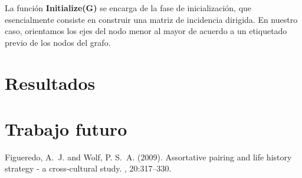 \documentclass[10pt, a4paper, twocolumn]{article} %
\begin{document}
\newpage
La función \textbf{Initialize(G)} se encarga de la fase de 
inicialización, que esencialmente consiste en construir 
una matriz de incidencia dirigida. En nuestro caso, orientamos los ejes 
del nodo menor al mayor de acuerdo a un etiquetado previo de los nodos 
del grafo. 


\section{Resultados}

\section{Trabajo futuro}


\begin{thebibliography}{99} %

Figueredo, A.~J. and Wolf, P. S.~A. (2009).
\newblock Assortative pairing and life history strategy - a cross-cultural
  study.
, 20:317--330.
 
\end{thebibliography}

\end{document}
